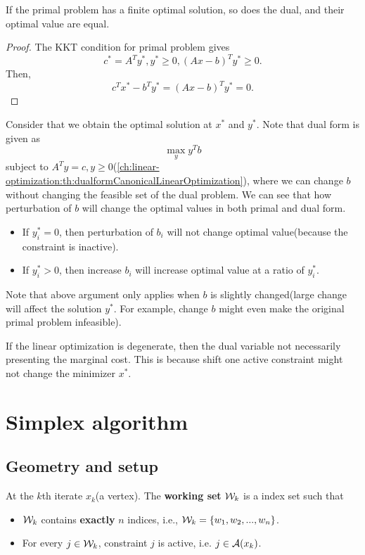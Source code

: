 \begin{refsection}
\begin{theorem}\cite[148]{bertsimas1997introduction}
If the primal problem has a finite optimal solution, so does the dual, and their optimal value are equal.	
\end{theorem}
\begin{proof}
The KKT condition for primal problem gives
$$c^* = A^Ty^*, y^*\geq 0, (Ax - b)^Ty^* \geq 0. $$
Then, $$c^Tx^* - b^Ty^* = (Ax - b)^Ty^* = 0.$$

\end{proof}




\begin{note}\cite[155]{bertsimas1997introduction}
Consider that we obtain the optimal solution at $x^*$ and $y^*$. Note that dual form is given as $$\max_{y} y^T b$$
subject to $ A^Ty = c,y \geq 0$(\autoref{ch:linear-optimization:th:dualformCanonicalLinearOptimization}), where we can change $b$ without changing the feasible set of the dual problem. We can see that how perturbation of $b$ will change the optimal values in both primal and dual form.
\begin{itemize}
	\item If $y^*_i = 0$, then perturbation of $b_i$ will not change optimal value(because the constraint is inactive).
	\item If $y_i^* > 0$, then increase $b_i$ will increase optimal value at a ratio of $y_i^*$.
\end{itemize}
Note that above argument only applies when $b$ is slightly changed(large change will affect the solution $y^*$. For example, change $b$ might even make the original primal problem infeasible).

If the linear optimization is degenerate, then the dual variable not necessarily presenting the marginal cost. This is because shift one active constraint might not change the minimizer $x^*$.
\end{note}

\section{Simplex algorithm}

\subsection{Geometry and setup}
\begin{definition}
	At the $k$th iterate $x_k$(a vertex). The \textbf{working set} $\mathcal{W}_k$ is a index set such that
	\begin{itemize}
		\item $\mathcal{W}_k$ contains \textbf{exactly} $n$ indices, i.e., $\mathcal{W}_k = \{w_1,w_2,...,w_n\}$.
		\item For every $j\in \mathcal{W}_k$, constraint $j$ is active, i.e. $j\in \mathcal{A}(x_k)$.
	\end{itemize}
	

\end{definition}
\end{refsection}
